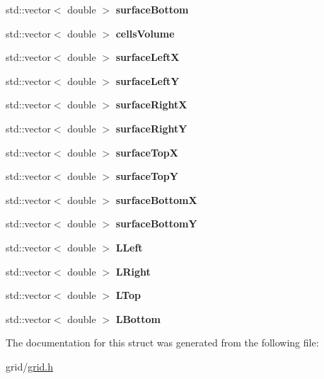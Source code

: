 \begin{DoxyCompactItemize}
\item 
\mbox{\label{struct_grid_ab0580b4617044146fbec48ff863ce4f5}} 
std\+::vector$<$ double $>$ {\bfseries surface\+Bottom}
\item 
\mbox{\label{struct_grid_a6037926916bf601fcd94a95cc9da6b3d}} 
std\+::vector$<$ double $>$ {\bfseries cells\+Volume}
\item 
\mbox{\label{struct_grid_a391fbebaca1a4113538cdbd966344c5a}} 
std\+::vector$<$ double $>$ {\bfseries surface\+LeftX}
\item 
\mbox{\label{struct_grid_a5411275daf3634a631b00ab0bd497c5c}} 
std\+::vector$<$ double $>$ {\bfseries surface\+LeftY}
\item 
\mbox{\label{struct_grid_a3d8f20047d7a91f7776d5a92d16c9872}} 
std\+::vector$<$ double $>$ {\bfseries surface\+RightX}
\item 
\mbox{\label{struct_grid_a13f071198dc8261c06e3cc44ebd1108c}} 
std\+::vector$<$ double $>$ {\bfseries surface\+RightY}
\item 
\mbox{\label{struct_grid_a6076250be1b0e33ce81774d4dd064c5f}} 
std\+::vector$<$ double $>$ {\bfseries surface\+TopX}
\item 
\mbox{\label{struct_grid_a8f538d0e30ac059c2f8172fc1ebb49b1}} 
std\+::vector$<$ double $>$ {\bfseries surface\+TopY}
\item 
\mbox{\label{struct_grid_aa74a25dfc0600150c60dd019294b850e}} 
std\+::vector$<$ double $>$ {\bfseries surface\+BottomX}
\item 
\mbox{\label{struct_grid_a4d98d5a5edb218f5bf844e3a9743fdb7}} 
std\+::vector$<$ double $>$ {\bfseries surface\+BottomY}
\item 
\mbox{\label{struct_grid_a8dedf49a7014423d45ed29cc81bdf5fb}} 
std\+::vector$<$ double $>$ {\bfseries L\+Left}
\item 
\mbox{\label{struct_grid_a185e8fe659832ad69b8ee8ad99f9fa5f}} 
std\+::vector$<$ double $>$ {\bfseries L\+Right}
\item 
\mbox{\label{struct_grid_a4e7e21691ef5ad7539218e17eb63ac03}} 
std\+::vector$<$ double $>$ {\bfseries L\+Top}
\item 
\mbox{\label{struct_grid_a346a13d9d9b860f05c230b83810adc20}} 
std\+::vector$<$ double $>$ {\bfseries L\+Bottom}
\end{DoxyCompactItemize}


The documentation for this struct was generated from the following file\+:\begin{DoxyCompactItemize}
\item 
grid/\mbox{\hyperlink{grid_8h}{grid.\+h}}\end{DoxyCompactItemize}
